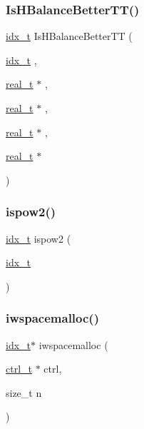 \subsubsection{\texorpdfstring{Is\+H\+Balance\+Better\+T\+T()}{IsHBalanceBetterTT()}}
{\footnotesize\ttfamily \hyperlink{a00876_aaa5262be3e700770163401acb0150f52}{idx\+\_\+t} Is\+H\+Balance\+Better\+TT (\begin{DoxyParamCaption}\item[{\hyperlink{a00876_aaa5262be3e700770163401acb0150f52}{idx\+\_\+t}}]{,  }\item[{\hyperlink{a00876_a1924a4f6907cc3833213aba1f07fcbe9}{real\+\_\+t} $\ast$}]{,  }\item[{\hyperlink{a00876_a1924a4f6907cc3833213aba1f07fcbe9}{real\+\_\+t} $\ast$}]{,  }\item[{\hyperlink{a00876_a1924a4f6907cc3833213aba1f07fcbe9}{real\+\_\+t} $\ast$}]{,  }\item[{\hyperlink{a00876_a1924a4f6907cc3833213aba1f07fcbe9}{real\+\_\+t} $\ast$}]{ }\end{DoxyParamCaption})}

\mbox{\label{a00951_abc7c59e9b47bd47f1c0e787db0efb8ee}} 
\subsubsection{\texorpdfstring{ispow2()}{ispow2()}}
{\footnotesize\ttfamily \hyperlink{a00876_aaa5262be3e700770163401acb0150f52}{idx\+\_\+t} ispow2 (\begin{DoxyParamCaption}\item[{\hyperlink{a00876_aaa5262be3e700770163401acb0150f52}{idx\+\_\+t}}]{ }\end{DoxyParamCaption})}

\mbox{\label{a00951_ac838f4c6cb4f30b2888cbea0003ffc61}} 
\subsubsection{\texorpdfstring{iwspacemalloc()}{iwspacemalloc()}}
{\footnotesize\ttfamily \hyperlink{a00876_aaa5262be3e700770163401acb0150f52}{idx\+\_\+t}$\ast$ iwspacemalloc (\begin{DoxyParamCaption}\item[{\hyperlink{a00742}{ctrl\+\_\+t} $\ast$}]{ctrl,  }\item[{size\+\_\+t}]{n }\end{DoxyParamCaption})}

